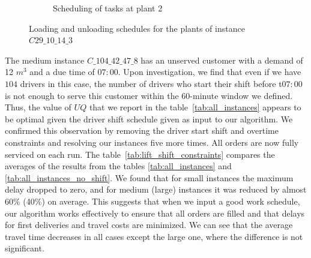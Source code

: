 \documentclass{article}
\begin{document}
\begin{figure}[htb]
\begin{subfigure}{\textwidth}
        \vspace*{-3em}
        \caption{Scheduling of tasks at plant  2}
        \label{fig:plant2}
    \end{subfigure}

    \caption{Loading and unloading schedules for the plants of instance $C29\_10\_14\_3$}
    \label{fig:plants_schedules}
\end{figure}

The medium instance $C\_104\_42\_47\_8$ has an unserved customer with a demand of 12 $m^3$ and a due time of $07:00$. Upon investigation, we find that even if we have $104$ drivers in this case, the number of drivers who start their shift before t$07:00$ is not enough to serve this customer within the 60-minute window we defined. Thus, the value of $UQ$ that we report in the table~\ref*{tab:all_instances} appears to be optimal given the driver shift schedule given as input to our algorithm. We confirmed this observation by removing the driver start shift and overtime constraints and resolving our instances five more times. All orders are now fully serviced on each run. The table~\ref*{tab:lift_shift_constraints} compares the averages of the results from  the tables \ref*{tab:all_instances} and \ref*{tab:all_instances_no_shift}. We found that for small instances the maximum delay dropped to zero, and for medium (large) instances it was reduced by almost 60\% (40\%) on average. This suggests that when we input a good work schedule, our algorithm works effectively to ensure that all orders are filled and that delays for first deliveries and travel costs are minimized. We can see that the average travel time decreases in all cases except the large one, where the difference is not significant.

\begin{table}[!h]
    \centering
    \small
    \caption{Comparison of the average results with and without shift and overtime constraints}
    \label{tab:lift_shift_constraints}
\end{table}
    
\end{document}
